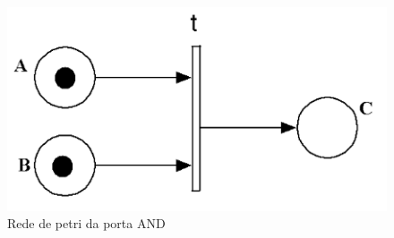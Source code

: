 \par

\par

\par

\begin{figure}[H]
	\begin{center}
    \caption{\label{fig:petri_AND}Rede de petri da porta AND}
	\includegraphics[scale=0.60]{Figuras/and_petri.png}
	\end{center}
\end{figure}

